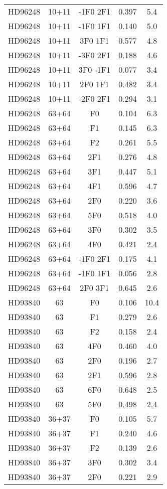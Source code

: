 \begin{table*}
\begin{tabular}{l c c c c}
HD96248 & 10+11 & -1F0 2F1 & 0.397 & 5.4\\ 
HD96248 & 10+11 & -1F0 1F1 & 0.140 & 5.0\\ 
HD96248 & 10+11 & 3F0 1F1 & 0.577 & 4.8\\ 
HD96248 & 10+11 & -3F0 2F1 & 0.188 & 4.6\\ 
HD96248 & 10+11 & 3F0 -1F1 & 0.077 & 3.4\\ 
HD96248 & 10+11 & 2F0 1F1 & 0.482 & 3.4\\ 
HD96248 & 10+11 & -2F0 2F1 & 0.294 & 3.1\\ 
\hline
HD96248 & 63+64 & F0 & 0.104 & 6.3\\ 
HD96248 & 63+64 & F1 & 0.145 & 6.3\\ 
HD96248 & 63+64 & F2 & 0.261 & 5.5\\ 
HD96248 & 63+64 & 2F1 & 0.276 & 4.8\\ 
HD96248 & 63+64 & 3F1 & 0.447 & 5.1\\ 
HD96248 & 63+64 & 4F1 & 0.596 & 4.7\\ 
HD96248 & 63+64 & 2F0 & 0.220 & 3.6\\ 
HD96248 & 63+64 & 5F0 & 0.518 & 4.0\\ 
HD96248 & 63+64 & 3F0 & 0.302 & 3.5\\ 
HD96248 & 63+64 & 4F0 & 0.421 & 2.4\\ 
HD96248 & 63+64 & -1F0 2F1 & 0.175 & 4.1\\ 
HD96248 & 63+64 & -1F0 1F1 & 0.056 & 2.8\\ 
HD96248 & 63+64 & 2F0 3F1 & 0.645 & 2.6\\ 
\hline
HD93840 & 63 & F0 & 0.106 & 10.4\\ 
HD93840 & 63 & F1 & 0.279 & 2.6\\ 
HD93840 & 63 & F2 & 0.158 & 2.4\\ 
HD93840 & 63 & 4F0 & 0.460 & 4.0\\ 
HD93840 & 63 & 2F0 & 0.196 & 2.7\\ 
HD93840 & 63 & 2F1 & 0.596 & 2.8\\ 
HD93840 & 63 & 6F0 & 0.648 & 2.5\\ 
HD93840 & 63 & 5F0 & 0.498 & 2.4\\ 
\hline
HD93840 & 36+37 & F0 & 0.105 & 5.7\\ 
HD93840 & 36+37 & F1 & 0.240 & 4.6\\ 
HD93840 & 36+37 & F2 & 0.139 & 2.6\\ 
HD93840 & 36+37 & 3F0 & 0.302 & 3.4\\ 
HD93840 & 36+37 & 2F0 & 0.221 & 2.9\\ 

\end{tabular}
\end{table*}
